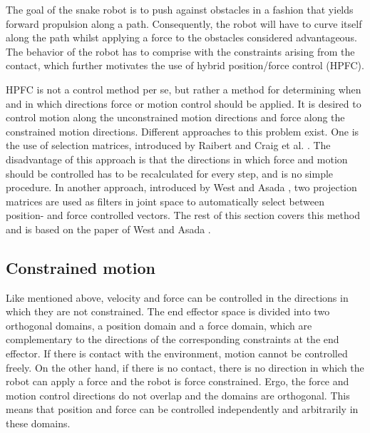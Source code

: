The goal of the snake robot is to push against obstacles in a fashion that yields forward propulsion along a path. Consequently, the robot will have to curve itself along the path whilst applying a force to the obstacles considered advantageous. The behavior of the robot has to comprise with the constraints arising from the contact, which further motivates the use of hybrid position/force control (HPFC).

HPFC is not a control method per se, but rather a method for determining when and in which directions force or motion control should be applied. It is desired to control motion along the unconstrained motion directions and force along the constrained motion directions. Different approaches to this problem exist. One is the use of selection matrices, introduced by Raibert and Craig et al. \cite{raibert1981hybrid}. The disadvantage of this approach is that the directions in which force and motion should be controlled has to be recalculated for every step, and is no simple procedure. In another approach, introduced by West and Asada \cite{west1985method}, two projection matrices are used as filters in joint space to automatically select between position- and force controlled vectors. The rest of this section covers this method and is based on the paper of West and Asada \cite{west1985method}.

\subsection{Constrained  motion}\label{subseq:HPFC}
Like mentioned above, velocity and force can be controlled in the directions in which they are not constrained. The end effector space is divided into two orthogonal domains, a position domain and a force domain, which are complementary to the directions of the corresponding constraints at the end effector. If there is contact with the environment, motion cannot be controlled freely. On the other hand, if there is no contact, there is no direction in which the robot can apply a force and the robot is force constrained. Ergo, the force and motion control directions do not overlap and the domains are orthogonal. This means that position and force can be controlled independently and arbitrarily in these domains.

